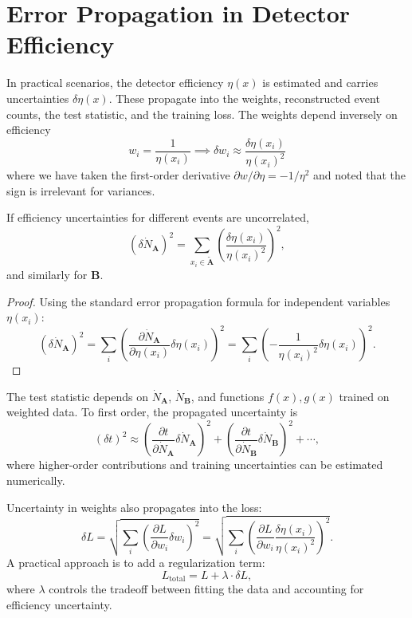 \documentclass[../../ddppaper3.tex]{subfiles}
\begin{document}
\section{Error Propagation in Detector Efficiency}
In practical scenarios, the detector efficiency \( \eta(x) \) is estimated and carries uncertainties \( \delta \eta(x) \). These propagate into the weights, reconstructed event counts, the test statistic, and the training loss. The weights depend inversely on efficiency
\[
w_i = \frac{1}{\eta(x_i)} \implies \delta w_i \approx \frac{\delta \eta(x_i)}{\eta(x_i)^2}
\]
where we have taken the first-order derivative \(\partial w / \partial \eta = -1/\eta^2\) and noted that the sign is irrelevant for variances.

\begin{proposition}
    If efficiency uncertainties for different events are uncorrelated,
\[
(\delta \dot{N}_{\mathbf{A}})^2 = \sum_{x_i \in \tilde{\mathbf{A}}} \left( \frac{\delta \eta(x_i)}{\eta(x_i)^2} \right)^2,
\]
and similarly for \( \mathbf{B} \).  
\end{proposition}

\begin{proof}
     Using the standard error propagation formula for independent variables \(\eta(x_i)\):
\[
(\delta \dot{N}_{\mathbf{A}})^2 = \sum_i \left( \frac{\partial \dot{N}_{\mathbf{A}}}{\partial \eta(x_i)} \delta \eta(x_i) \right)^2 = \sum_i \left( -\frac{1}{\eta(x_i)^2} \delta \eta(x_i) \right)^2.
\]
\end{proof}

The test statistic depends on \( \dot{N}_{\mathbf{A}} \), \( \dot{N}_{\mathbf{B}} \), and functions \( f(x), g(x) \) trained on weighted data. To first order, the propagated uncertainty is
\[
(\delta t)^2 \approx \left( \frac{\partial t}{\partial \dot{N}_{\mathbf{A}}} \delta \dot{N}_{\mathbf{A}} \right)^2 + \left( \frac{\partial t}{\partial \dot{N}_{\mathbf{B}}} \delta \dot{N}_{\mathbf{B}} \right)^2 + \cdots,
\]
where higher-order contributions and training uncertainties can be estimated numerically.

Uncertainty in weights also propagates into the loss:
\[
\delta L = \sqrt{
\sum_{i} \left( \frac{\partial L}{\partial w_i} \delta w_i \right)^2
} = \sqrt{
\sum_{i} \left( \frac{\partial L}{\partial w_i} \frac{\delta \eta(x_i)}{\eta(x_i)^2} \right)^2
}.
\]
A practical approach is to add a regularization term:
\[
L_{\mathrm{total}} = L + \lambda \cdot \delta L,
\]
where \(\lambda\) controls the tradeoff between fitting the data and accounting for efficiency uncertainty.
\end{document}

